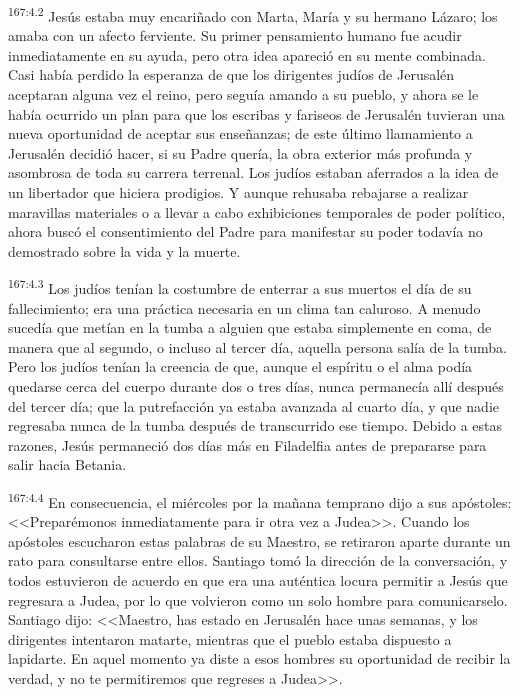 \par 
\textsuperscript{167:4.2} Jesús estaba muy encariñado con Marta, María y su hermano Lázaro; los amaba con un afecto ferviente. Su primer pensamiento humano fue acudir inmediatamente en su ayuda, pero otra idea apareció en su mente combinada. Casi había perdido la esperanza de que los dirigentes judíos de Jerusalén aceptaran alguna vez el reino, pero seguía amando a su pueblo, y ahora se le había ocurrido un plan para que los escribas y fariseos de Jerusalén tuvieran una nueva oportunidad de aceptar sus enseñanzas; de este último llamamiento a Jerusalén decidió hacer, si su Padre quería, la obra exterior más profunda y asombrosa de toda su carrera terrenal. Los judíos estaban aferrados a la idea de un libertador que hiciera prodigios. Y aunque rehusaba rebajarse a realizar maravillas materiales o a llevar a cabo exhibiciones temporales de poder político, ahora buscó el consentimiento del Padre para manifestar su poder todavía no demostrado sobre la vida y la muerte.

\par 
\textsuperscript{167:4.3} Los judíos tenían la costumbre de enterrar a sus muertos el día de su fallecimiento; era una práctica necesaria en un clima tan caluroso. A menudo sucedía que metían en la tumba a alguien que estaba simplemente en coma, de manera que al segundo, o incluso al tercer día, aquella persona salía de la tumba. Pero los judíos tenían la creencia de que, aunque el espíritu o el alma podía quedarse cerca del cuerpo durante dos o tres días, nunca permanecía allí después del tercer día; que la putrefacción ya estaba avanzada al cuarto día, y que nadie regresaba nunca de la tumba después de transcurrido ese tiempo. Debido a estas razones, Jesús permaneció dos días más en Filadelfia antes de prepararse para salir hacia Betania.

\par 
\textsuperscript{167:4.4} En consecuencia, el miércoles por la mañana temprano dijo a sus apóstoles: <<Preparémonos inmediatamente para ir otra vez a Judea>>. Cuando los apóstoles escucharon estas palabras de su Maestro, se retiraron aparte durante un rato para consultarse entre ellos. Santiago tomó la dirección de la conversación, y todos estuvieron de acuerdo en que era una auténtica locura permitir a Jesús que regresara a Judea, por lo que volvieron como un solo hombre para comunicarselo. Santiago dijo: <<Maestro, has estado en Jerusalén hace unas semanas, y los dirigentes intentaron matarte, mientras que el pueblo estaba dispuesto a lapidarte. En aquel momento ya diste a esos hombres su oportunidad de recibir la verdad, y no te permitiremos que regreses a Judea>>.

